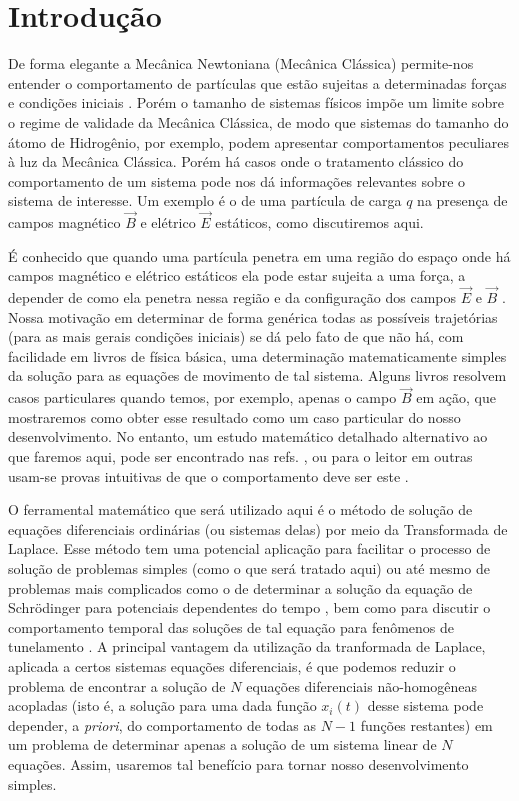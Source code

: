 \documentclass[twocolumn]{rbef}
\newcommand{\1}{\mathbbm{1}}
\begin{document}
\section{Introdução}

De forma elegante a Mecânica Newtoniana (Mecânica Clássica)
permite-nos entender o comportamento de partículas que estão
sujeitas a determinadas forças e condições iniciais
\cite{Sommerfeld,Landau}. Porém o tamanho de sistemas físicos
impõe um limite sobre o regime de validade da Mecânica Clássica,
de modo que sistemas do tamanho do átomo de Hidrogênio, por
exemplo, podem apresentar comportamentos peculiares à luz da
Mecânica Clássica. Porém há casos onde o tratamento clássico do
comportamento de um sistema pode nos dá informações relevantes
sobre o sistema de interesse. Um exemplo é o de uma partícula de
carga $q$ na presença de campos magnético $\vec{B}$ e elétrico
$\vec{E}$ estáticos, como discutiremos aqui.

É conhecido que quando uma partícula penetra em uma região do
espaço onde há campos magnético e elétrico estáticos ela pode
estar sujeita a uma força, a depender de como ela penetra nessa
região e da configuração dos campos $\vec{E}$ e $\vec{B}$
\cite{Griffiths,Moyses,Marion}. Nossa motivação em determinar de
forma genérica todas as possíveis trajetórias (para as mais
gerais condições iniciais) se dá pelo fato de que não há, com
facilidade em livros de física básica, uma determinação
matematicamente simples da solução para as equações de movimento
de tal sistema. Alguns livros resolvem casos particulares quando
temos, por exemplo, apenas o campo $\vec{B}$ em ação, que
mostraremos como obter esse resultado como um caso particular do
nosso desenvolvimento. No entanto, um estudo matemático
detalhado alternativo ao que faremos aqui, pode ser encontrado
nas refs. \cite{Griffiths,Marion}, ou para o leitor em outras
usam-se provas intuitivas de que o comportamento deve ser este
\cite{Moyses2}.

O ferramental matemático que será utilizado aqui é o método de
solução de equações diferenciais ordinárias (ou sistemas delas)
por meio da Transformada de Laplace. Esse método tem uma
potencial aplicação para facilitar o processo de solução de
problemas simples (como o que será tratado aqui) ou até mesmo de
problemas mais complicados como o de determinar a solução da
equação de Schrödinger para potenciais dependentes do tempo
\cite{Natascha:16}, bem como para discutir o comportamento
temporal das soluções de tal equação para fenômenos de
tunelamento \cite{Ref1Natascha:16,Ref2Natascha:16}. A principal
vantagem da utilização da tranformada de Laplace, aplicada a
certos sistemas equações diferenciais, é que podemos reduzir o
problema de encontrar a solução de $N$ equações diferenciais
não-homogêneas acopladas (isto é, a solução para uma dada função
$x_{i}(t)$ desse sistema pode depender, a \textit{priori}, do
comportamento de todas as $N-1$ funções restantes) em um
problema de determinar apenas a solução de um sistema linear de
$N$ equações. Assim, usaremos tal benefício para tornar nosso
desenvolvimento simples.
\end{document}
